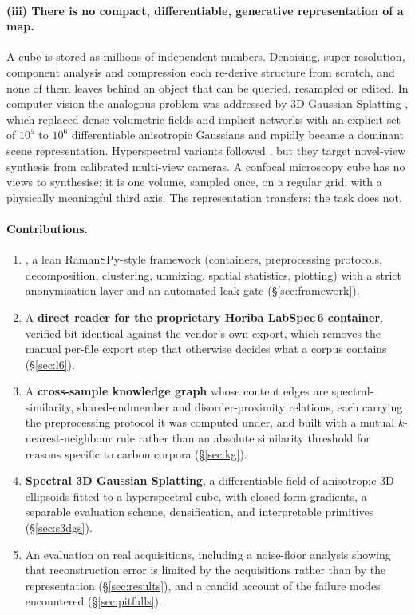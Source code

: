 \paragraph{(iii) There is no compact, differentiable, generative
representation of a map.}
A cube is stored as millions of independent numbers. Denoising,
super-resolution, component analysis and compression each re-derive structure
from scratch, and none of them leaves behind an object that can be queried,
resampled or edited. In computer vision the analogous problem was addressed by
3D Gaussian Splatting \cite{kerbl20233dgs}, which replaced dense volumetric
fields and implicit networks with an explicit set of $10^5$ to $10^6$
differentiable anisotropic Gaussians and rapidly became a dominant scene
representation. Hyperspectral variants followed
\cite{thirgood2025hypergs,spectralgaussians2025,ddhgs2025}, but they target
novel-view synthesis from calibrated multi-view cameras. A confocal microscopy
cube has no views to synthesise: it is one volume, sampled once, on a regular
grid, with a physically meaningful third axis. The representation transfers;
the task does not.

\paragraph{Contributions.}
\begin{enumerate}\itemsep2pt
\item \ramansp{}, a lean RamanSPy-style framework (containers, preprocessing
protocols, decomposition, clustering, unmixing, spatial statistics, plotting)
with a strict anonymisation layer and an automated leak gate
(\S\ref{sec:framework}).
\item A \textbf{direct reader for the proprietary Horiba LabSpec\,6
container}, verified bit identical against the vendor's own export, which
removes the manual per-file export step that otherwise decides what a corpus
contains (\S\ref{sec:l6}).
\item A \textbf{cross-sample knowledge graph} whose content edges are
spectral-similarity, shared-endmember and disorder-proximity relations, each
carrying the preprocessing protocol it was computed under, and built with a
mutual $k$-nearest-neighbour rule rather than an absolute similarity threshold
for reasons specific to carbon corpora (\S\ref{sec:kg}).
\item \textbf{Spectral 3D Gaussian Splatting}, a differentiable field of
anisotropic 3D ellipsoids fitted to a hyperspectral cube, with closed-form
gradients, a separable evaluation scheme, densification, and interpretable
primitives (\S\ref{sec:s3dgs}).
\item An evaluation on \Nacq{} real acquisitions, including a noise-floor
analysis showing that reconstruction error is limited by the acquisitions
rather than by the representation (\S\ref{sec:results}), and a candid account
of the failure modes encountered (\S\ref{sec:pitfalls}).
\end{enumerate}

